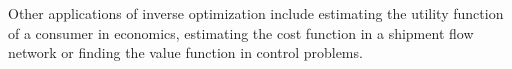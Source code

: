 \documentclass[12pt, a4paper]{article}
\begin{document}
Other applications of inverse optimization include estimating the utility function of a consumer in economics, estimating the cost function in a shipment flow network or finding the value function in control problems.\par

\end{document}
